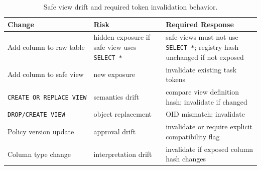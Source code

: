 \documentclass[10pt,twocolumn]{article}
\begin{document}
\begin{table}[p]
\centering
\small
\setlength{\tabcolsep}{3pt}
\caption{Safe view drift and required token invalidation behavior.}
\label{tab:schema-drift}
\begin{tabular}{@{}
  >{\raggedright\arraybackslash}p{}
  >{\raggedright\arraybackslash}p{}
  >{\raggedright\arraybackslash}p{}@{}}
\toprule
Change & Risk & Required Response \\
\midrule
Add column to raw table & hidden exposure if safe view uses
\texttt{SELECT\ *} & safe views must not use \texttt{SELECT\ *};
registry hash unchanged if not exposed \\
Add column to safe view & new exposure & invalidate existing task
tokens \\
\texttt{CREATE\ OR\ REPLACE\ VIEW} & semantics drift & compare view
definition hash; invalidate if changed \\
\texttt{DROP/CREATE\ VIEW} & object replacement & OID mismatch;
invalidate \\
Policy version update & approval drift & invalidate or require explicit
compatibility flag \\
Column type change & interpretation drift & invalidate if exposed column
hash changes \\
\bottomrule
\end{tabular}
\end{table}
\end{document}

